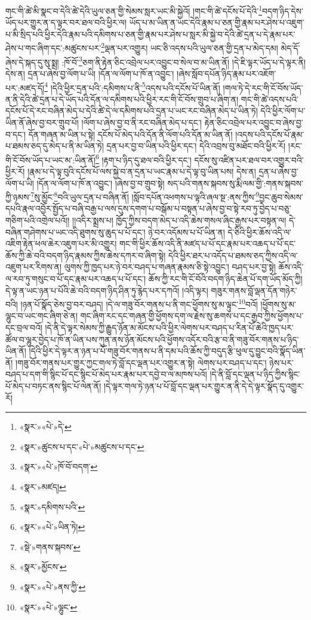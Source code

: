 གང་གི་ཚེ་མི་སྣང་བ་དེའི་ཚེ་དེའི་ཡུལ་ཅན་གྱི་སེམས་སླར་ཡང་མི་སྐྱེའོ། །གང་གི་ཚེ་དངོས་པོ་དེའི་\footnote{«སྣར་»«པེ་»དེ་}བདག་ཉིད་དེས་ཡོད་པར་གྱུར་ན་ད་ལྟར་བར་ཐལ་བའི་ཕྱིར་ལ། ཡོད་པ་མ་ཡིན་ན་ཡང་དེའི་རྣམ་པ་ཅན་གྱི་རྣམ་པར་ཤེས་པ་འཇུག་པ་མི་སྲིད་པའི་ཕྱིར་དེའི་རྣམ་པའི་དམིགས་པ་ཅན་གྱི་རྣམ་པར་ཤེས་པ་སླར་མི་སྐྱེ་བ་དེའི་ཚེ་དྲན་པ་དེ་རྣམ་པར་ཤེས་པ་གང་ཞིག་དང་:མཚུངས་པར་\footnote{«སྣར་»ཚུངས་པ་དང་«པེ་»མཚུངས་པ་དང་}ལྡན་པར་འགྱུར། ཡང་ཅི་འདས་པའི་ཡུལ་ཅན་གྱི་དྲན་པ་མེད་དམ། མེད་དོ་ཞེས་དེ་སྐད་དུ་སུ་སྨྲ། :ཁོ་བོ་\footnote{«སྣར་»«པེ་»ཁོ་བོ་བདག་}ཅག་ནི་རྟེན་ཅིང་འབྲེལ་པར་འབྱུང་བ་སེལ་བ་མ་ཡིན་ནོ། །དེ་ཇི་ལྟར་ཡོད་པ་དེ་ལྟར་ནི། དེས་ན། དྲན་པ་ཞེས་བྱ་ལོག་པ་ཡི། །དོན་ལ་ལོག་པ་ཁོ་ན་འབྱུང་། །ཞེས་སློབ་དཔོན་ཉིད་རྣམ་པར་འཇོག་པར་:མཛད་དོ།\footnote{«སྣར་»མཛད།} །དེའི་ཕྱིར་དྲན་པའི་:དམིགས་པ་ནི་\footnote{«སྣར་»དམིགས་པའི་}འདས་པའི་དངོས་པོ་ཡིན་ནོ། །གལ་ཏེ་དེ་རང་གི་ངོ་བོས་ཡོད་ན་ནི་དེའི་ཚེ་དྲན་པ་དེ་ཡོད་པའི་དོན་ལ་དམིགས་པའི་ཕྱིར་རང་གི་ངོ་བོས་གྲུབ་པ་ཞིག་ན། གང་གི་ཚེ་འདས་པའི་དངོས་པོ་དེ་རང་བཞིན་མེད་པ་དེའི་ཚེ་དེ་ལ་དམིགས་པའི་དྲན་པ་ཡང་རང་བཞིན་མེད་པ་ཡིན་ཏེ། དེའི་ཕྱིར་ལོག་པ་ཡིན་ནོ་ཞེས་བྱ་བར་གྲུབ་པོ། །ལོག་པ་ཞེས་བྱ་བ་ནི་རང་བཞིན་མེད་པ་དང་། རྟེན་ཅིང་འབྲེལ་པར་འབྱུང་བ་ཞེས་བྱ་བ་དང་། དོན་གཞན་མ་ཡིན་པ་སྟེ། དངོས་པོ་མེད་པའི་དོན་ནི་ལོག་པའི་དོན་མ་ཡིན་ནོ། །འདས་པའི་དངོས་པོ་རྣམ་པ་ཐམས་ཅད་དུ་མེད་པ་ནི་མ་ཡིན་ཏེ། དྲན་པར་བྱ་བ་ཡིན་པའི་ཕྱིར་དང་། དེའི་འབྲས་བུ་མཐོང་བའི་ཕྱིར་རོ། །རང་གི་ངོ་བོས་ཡོད་པ་ཡང་མ་:ཡིན་ནོ།\footnote{«སྣར་»«པེ་»ཡིན་ཏེ།} །རྟག་པ་ཉིད་དུ་ཐལ་བའི་ཕྱིར་དང་། དངོས་སུ་འཛིན་པར་ཐལ་བར་འགྱུར་བའི་ཕྱིར་རོ། །རྣམ་པ་དེ་ལྟ་བུའི་དངོས་པོ་ལས་སྐྱེ་བ་ན་དྲན་པ་ཡང་རྣམ་པ་དེ་ལྟ་བུ་ཡིན་པས། དེས་ན། དྲན་པ་ཞེས་བྱ་ལོག་པ་ཡི། །དོན་ལ་ལོག་པ་ཁོ་ན་འབྱུང་། །ཞེས་བྱ་བ་གྲུབ་སྟེ། སད་པའི་གནས་སྐབས་སུ་རྨི་ལམ་གྱི་:གནས་སྐབས་ཀྱི་ཉམས་\footnote{«སྡེ་»གནས་སྐབས་}སུ་མྱོང་\footnote{«སྣར་»མྱོངས་}བའི་ཡུལ་དྲན་པ་བཞིན་ནོ། །སློབ་དཔོན་འཕགས་པ་ལྟའི་ཞལ་སྔ་:ནས་ཀྱིས་\footnote{«སྣར་»«པེ་»ནས་ཀྱི་}བྱང་ཆུབ་སེམས་དཔའི་རྣལ་འབྱོར་སྤྱོད་པ་བཞི་བརྒྱ་པ་ལས་དུས་དགག་པ་བསྒོམ་པ་བསྟན་པ་ཞེས་བྱ་བ་སྟེ་རབ་ཏུ་བྱེད་པ་བཅུ་གཅིག་པའི་འགྲེལ་པའོ།། །།འདིར་སྨྲས་པ། ཁྱོད་ཀྱིས་བདག་མེད་པ་འདི་ཆེས་གསལ་ཞིང་རྒྱས་པར་བསྟན་ལ། དེ་བཞིན་གཤེགས་པ་ཡང་འདི་ཐུགས་སུ་ཆུད་པ་པོ་དང་། ཉེ་བར་འདོམས་པ་པོ་ཡིན་ན། དེ་ཅིའི་ཕྱིར་ཆོས་འདི་ལ་འཇིག་རྟེན་ཕལ་ཆེར་འཇུག་པར་མི་འགྱུར། གང་གི་ཕྱིར་ཆོས་འདི་ནི་མཛད་པ་པོ་དང་རྣམ་པར་འཆད་པ་པོ་དང་ཆོས་ཀྱི་ཆེ་བའི་བདག་ཉིད་རྣམས་ཀྱིས་ཆེས་དཀར་བ་ཞིག་སྟེ། དེའི་ཕྱིར་ཐར་པ་འདོད་པ་ཐམས་ཅད་ཀྱིས་འདི་ལ་འཇུག་པར་རིགས་ན། ལུགས་ཀྱི་ཁྱད་པར་ཉེ་བར་བཤད་པ་གཞན་རྣམས་ཅི་སྟེ་འབྱུང་། བཤད་པར་བྱ་སྟེ། ཆོས་འདི་ལ་རབ་ཏུ་གསུང་བ་པོ་དང་རྣམ་པར་འཆད་པ་པོ་དང་། ཆོས་ཀྱི་རང་གི་ངོ་བོའི་བདག་ཉིད་ཆེན་པོ་དག་ཡོད་མོད་ཀྱི། དེ་ལྟ་ན་ཡང་ཉན་པ་པོའི་ཆེ་བའི་བདག་ཉིད་ཤིན་ཏུ་རྙེད་པར་དཀའོ། །འདི་ལྟར། གཟུར་གནས་བློ་ལྡན་དོན་གཉེར་བའི། །ཉན་པོ་སྣོད་ཅེས་བྱ་བར་བཤད། །དེ་ལ་གཟུ་བོར་གནས་པ་ནི་གང་ཕྱོགས་སུ་མ་ལྟུང་\footnote{«སྣར་»«པེ་»ལྷུང་}བའོ། །ཕྱོགས་སུ་མ་ལྷུང་བ་ཡང་གང་ཞིག་ཅེ་ན། གང་ཞིག་རང་དང་གཞན་གྱི་ཕྱོགས་དག་ལ་རྗེས་སུ་ཆགས་པ་དང་རྒྱབ་ཀྱིས་ཕྱོགས་པ་དང་བྲལ་བའོ། །དེ་ནི་དེ་ལྟར་སེམས་ཀྱི་རྒྱུད་ཉོན་མ་མོངས་པའི་ཕྱིར་ལེགས་པར་བཤད་པ་རིན་པོ་ཆེའི་ཁྱད་པར་ཚོལ་བ་ལྷུར་བྱེད་པ་ཁོ་ན་ཡིན་པས་ཀུན་ནས་ཉོན་མོངས་པའི་ཕྱོགས་འདོར་བའི་རྩ་བ་ནི་གཟུ་བོར་གནས་པ་ཉིད་ཡིན་ནོ། །དེའི་ཕྱིར་དེ་ལྟར་ན་ཉན་པ་པོ་གཟུ་བོར་གནས་པ་ནི་དམ་པའི་ཆོས་ཀྱི་བདུད་རྩི་ཕུལ་དུ་བྱུང་བའི་སྣོད་ཡིན་ནོ། །གཟུ་བོར་གནས་པར་གྱུར་ཀྱང་གལ་ཏེ་བློ་དང་ལྡན་པར་འགྱུར་ན་སྟེ། ལེགས་པར་བཤད་པ་དང་། ཉེས་པར་བཤད་པ་དག་གི་སྙིང་པོ་དང་སྙིང་པོ་མེད་པར་རྣམ་པར་དབྱེ་བ་ལ་མཁས་པའོ། །དེ་ནི་བློ་དང་ལྡན་པ་ཉིད་ཀྱིས་སྙིང་པོ་མེད་པ་བཏང་ནས་སྙིང་པོ་ལེན་ནོ། །དེ་ལྟར་གལ་ཏེ་ཉན་པ་པོ་བློ་དང་ལྡན་པར་གྱུར་ན་ནི་དེ་དེ་ལྟར་སྣོད་དུ་འགྱུར་རོ། 